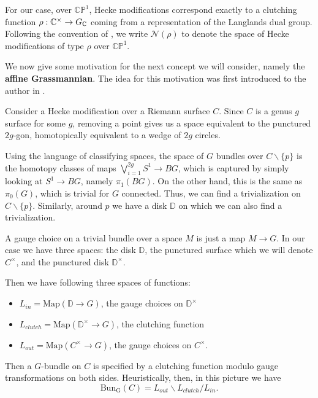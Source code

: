 	
	
	For our case, over $\mathbb{CP}^1$, Hecke modifications correspond exactly to a clutching function $\rho: \mathbb{C}^\times \to G_{\mathbb{C}}$ coming from a representation of the Langlands dual group. Following the convention of \cite{witten2010}, we write $\mathcal N(\rho)$ to denote the space of Hecke modifications of type $\rho$ over $\mathbb{CP}^1$.
	
	We now give some motivation for the next concept we will consider, namely the \textbf{affine Grassmannian}. The idea for this motivation was first introduced to the author in \cite{Yoo17}.
	\begin{mot}
		Consider a Hecke modification over a Riemann surface $C$. Since $C$ is a genus $g$ surface for some $g$, removing a point gives us a space equivalent to the punctured $2g$-gon, homotopically equivalent to a wedge of $2g$ circles. 
	
		Using the language of classifying spaces, the space of $G$ bundles over $C \backslash \{p\}$ is the homotopy classes of maps $\bigvee_{i=1}^{2g} S^1 \to BG$, which is captured by simply looking at $S^1 \to BG$, namely $\pi_1(BG)$. On the other hand, this is the same as $\pi_0(G)$, which is trivial for $G$ connected. Thus, we can find a trivialization on $C \backslash \{ p \}$. Similarly, around $p$ we have a disk $\mathbb D$ on which we can also find a trivialization.
		
		A gauge choice on a trivial bundle over a space $M$ is just a map $M \to G$. In our case we have three spaces: the disk $\mathbb D$, the punctured surface which we will denote $C^\times$, and the punctured disk $\mathbb D^\times$. 
		
		Then we have following three spaces of functions:
		\begin{itemize}
			\item $L_{in} = \mathrm{Map}(\mathbb D \to G)$, the gauge choices on $\mathbb D^\times$
			\item $L_{clutch} = \mathrm{Map}(\mathbb D^\times \to G)$, the clutching function
			\item $L_{out} = \mathrm{Map}(C^\times \to G)$, the gauge choices on $C^\times$.
		\end{itemize}
		
		Then a $G$-bundle on $C$ is specified by a clutching function modulo gauge transformations on both sides.
		Heuristically, then, in this picture we have
		\[
			\mathrm{Bun_G}(C) = L_{out} \backslash L_{clutch} / L_{in}.
		\]
	\end{mot}
